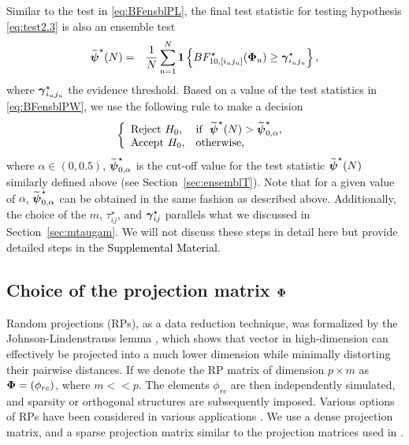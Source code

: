 \documentclass[APA,Times1COL]{WileyNJDv5} %
\def\be{\begin{eqnarray}}
\def\ee{\end{eqnarray}}
\def\boldpsi{{\mbox{\boldmath $\psi$}}}
\def\bone{{\mathbf 1}}
\newcommand{\ugamma}            {\mbox{\boldmath$\gamma$}}
\newcommand{\uPhi}              {\mbox{\boldmath$\Phi$}}
\begin{document}
Similar to the test in \eqref{eq:BFensblPL}, the final test statistic for testing hypothesis \eqref{eq:test2.3} is also an ensemble test 
\be
\widetilde{\boldpsi}^{\star}(N) &=& \frac{1}{N}\sum^{N}_{u=1} \bone \left\{ BF^{\star}_{10, [i_u j_u]}(\uPhi_u) \geq \ugamma^{\star}_{i_u j_u} \right\}, \label{eq:BFensblPW}
\ee
where $\ugamma^{\star}_{i_u j_u}$ the evidence threshold. 
Based on a value of the test statistics in \eqref{eq:BFensblPW}, we use the following rule to make a decision
\be
 \left \{
       \begin{array}{llll}
       \mbox{Reject}~ H_{0}, & \mbox{if} ~~ \widetilde{\boldpsi}^{\star}(N) > \widetilde{\boldpsi}^{\star}_{0, \alpha},  \\
       \mbox{Accept}~ H_{0}, & \mbox{otherwise}, \label{eq:ensembleTestPw}
       \end{array}
       \right. \;
\ee
where $\alpha \in (0, 0.5)$, $\widetilde{\boldpsi}^{\star}_{0, \alpha}$ is the cut-off value for the test statistic $\widetilde{\boldpsi}^{\star}(N)$ similarly defined above (see Section~\ref{sec:ensemblT}). Note that for a given value of $\alpha$, $\widetilde{\boldpsi}^{\star}_{0, \alpha}$ can be obtained in the same fashion as described above. Additionally, the choice of the $m$, $\tau^{\star}_{ij}$, and $\ugamma^{\star}_{ij}$ parallels what we discussed in Section~\ref{sec:mtaugam}. We will not discuss these steps in detail here but provide detailed steps in the \textcolor{black}{Supplemental Material}.    

\subsection{Choice of the projection matrix $\uPhi$}
Random projections (RPs), as a data reduction technique, was formalized by the Johnson-Lindenstrauss lemma \citep{johnson84extensionslipschitz}, which shows that vector in high-dimension can effectively be projected into a much lower dimension while minimally distorting their pairwise distances. If we denote the RP matrix of dimension $p \times m$ as $\uPhi = (\phi_{rc})$, where $m << p$. The elements $\phi_{rc}$ are then independently simulated, and sparsity or orthogonal structures are subsequently imposed. Various options of RPs have been considered in various applications \citep{achlioptas2001database,li2006very,lopes2011more}. We use a dense projection matrix, and a sparse projection matrix similar to the projection matrices used in \citep{srivastava2014raptt,zoh2018powerful}.      
\end{document}
